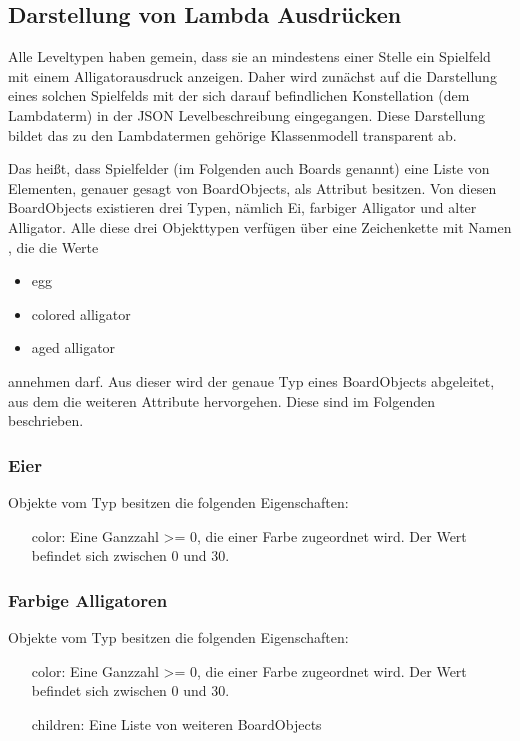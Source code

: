 \subsection{Darstellung von Lambda Ausdrücken}
Alle Leveltypen haben gemein, dass sie an mindestens einer Stelle ein Spielfeld mit einem Alligatorausdruck anzeigen.
Daher wird zunächst auf die Darstellung eines solchen Spielfelds mit der sich darauf befindlichen Konstellation (dem Lambdaterm) in der JSON Levelbeschreibung eingegangen.
Diese Darstellung bildet das zu den Lambdatermen gehörige Klassenmodell transparent ab.


Das heißt, dass Spielfelder (im Folgenden auch Boards genannt) eine Liste von Elementen, genauer gesagt von BoardObjects, als Attribut besitzen.
Von diesen BoardObjects existieren drei Typen, nämlich Ei, farbiger Alligator und alter Alligator.
Alle diese drei Objekttypen verfügen über eine Zeichenkette mit Namen , die die Werte
\begin{itemize}
	\item egg
	\item colored alligator
	\item aged alligator
\end{itemize}
annehmen darf.
Aus dieser wird der genaue Typ eines BoardObjects abgeleitet, aus dem die weiteren Attribute hervorgehen.
Diese sind im Folgenden beschrieben.

\subsubsection{Eier}
Objekte vom Typ  besitzen die folgenden Eigenschaften:
\begin{itemize}
	\item[color:] Eine Ganzzahl >= 0, die einer Farbe zugeordnet wird. Der Wert befindet sich zwischen 0 und 30.
\end{itemize}

\subsubsection{Farbige Alligatoren}
Objekte vom Typ  besitzen die folgenden Eigenschaften:
\begin{itemize}
	\item[color:] Eine Ganzzahl >= 0, die einer Farbe zugeordnet wird. Der Wert befindet sich zwischen 0 und 30.
	\item[children:] Eine Liste von weiteren BoardObjects
\end{itemize}

